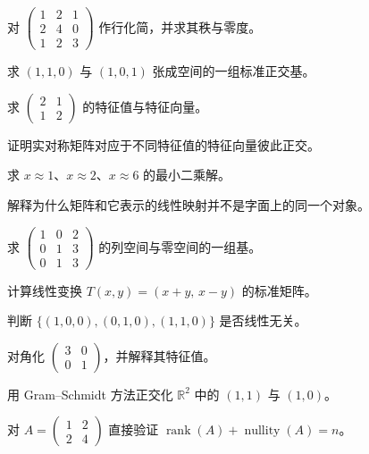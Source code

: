 \begin{chapterexercises}
    \item 对 $\begin{pmatrix}1&2&1\\2&4&0\\1&2&3\end{pmatrix}$ 作行化简，并求其秩与零度。
    \item 求 $(1,1,0)$ 与 $(1,0,1)$ 张成空间的一组标准正交基。
    \item 求 $\begin{pmatrix}2&1\\1&2\end{pmatrix}$ 的特征值与特征向量。
    \item 证明实对称矩阵对应于不同特征值的特征向量彼此正交。
    \item 求 $x\approx1$、$x\approx2$、$x\approx6$ 的最小二乘解。
    \item 解释为什么矩阵和它表示的线性映射并不是字面上的同一个对象。
    \item 求 $\begin{pmatrix}1&0&2\\0&1&3\\0&1&3\end{pmatrix}$ 的列空间与零空间的一组基。
    \item 计算线性变换 $T(x,y)=(x+y,\,x-y)$ 的标准矩阵。
    \item 判断 $\{(1,0,0),(0,1,0),(1,1,0)\}$ 是否线性无关。
    \item 对角化 $\begin{pmatrix}3&0\\0&1\end{pmatrix}$，并解释其特征值。
    \item 用 Gram--Schmidt 方法正交化 $\mathbb{R}^2$ 中的 $(1,1)$ 与 $(1,0)$。
    \item 对 $A=\begin{pmatrix}1&2\\2&4\end{pmatrix}$ 直接验证 $\operatorname{rank}(A)+\operatorname{nullity}(A)=n$。
\end{chapterexercises}

